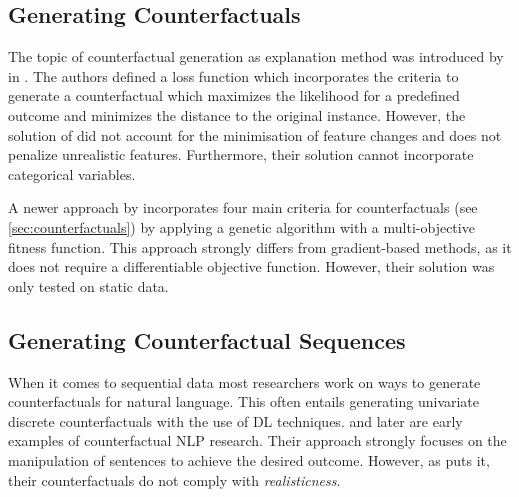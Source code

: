 \documentclass[./../../paper.tex]{subfiles}
\begin{document}
\subsection{Generating Counterfactuals}
The topic of counterfactual generation as explanation method was introduced by \citeauthor{wachter_CounterfactualExplanationsOpening_2018} in \citeyear{wachter_CounterfactualExplanationsOpening_2018}\cite{wachter_CounterfactualExplanationsOpening_2018}. The authors defined a loss function which incorporates the criteria to generate a counterfactual which maximizes the likelihood for a predefined outcome and minimizes the distance to the original instance. However, the solution of \citeauthor{wachter_CounterfactualExplanationsOpening_2018} did not account for the minimisation of feature changes and does not penalize unrealistic features. Furthermore, their solution cannot incorporate categorical variables.

A newer approach by \citeauthor{dandl_MultiObjectiveCounterfactualExplanations_2020} incorporates four main criteria for counterfactuals (see \autoref{sec:counterfactuals}) by applying a genetic algorithm with a multi-objective fitness function\cite{dandl_MultiObjectiveCounterfactualExplanations_2020}. This approach strongly differs from gradient-based methods, as it does not require a differentiable objective function. However, their solution was only tested on static data.

\subsection{Generating Counterfactual Sequences}
When it comes to sequential data most researchers work on ways to generate counterfactuals for natural language. This often entails generating univariate discrete counterfactuals with the use of \gls{DL} techniques. \citeauthor{martens_Explainingdatadrivendocument_2014} and later \citeauthor{krause_InteractingPredictionsVisual_2016} are early examples of counterfactual NLP research\cite{martens_Explainingdatadrivendocument_2014,krause_InteractingPredictionsVisual_2016}. Their approach strongly focuses on the manipulation of sentences to achieve the desired outcome. However, as \citeauthor{robeer_GeneratingRealisticNatural_2021} puts it, their counterfactuals do not comply with \emph{realisticness}\cite{robeer_GeneratingRealisticNatural_2021}.
\end{document}
